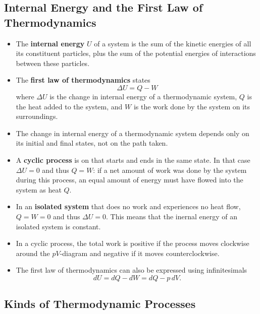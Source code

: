 \documentclass{article}
\begin{document}
\subsection{Internal Energy and the First Law of Thermodynamics}

\begin{itemize}
  \item The \textbf{internal energy} $U$ of a system is the sum of the kinetic energies of all its constituent particles, plus the sum of the potential energies of interactions between these particles.

  \item The \textbf{first law of thermodynamics} states \[\Delta U = Q - W\] where $\Delta U$ is the change in internal energy of a thermodynamic system, $Q$ is the heat added to the system, and $W$ is the work done by the system on its surroundings.

  \item The change in internal energy of a thermodynamic system depends only on its initial and final states, not on the path taken.

  \item A \textbf{cyclic process} is on that starts and ends in the same state. In that case $\Delta U = 0$ and thus $Q = W$: if a net amount of work was done by the system during this process, an equal amount of energy must have flowed into the system as heat $Q$.

  \item In an \textbf{isolated system} that does no work and experiences no heat flow, $Q = W = 0$ and thus $\Delta U = 0$. This means that the inernal energy of an isolated system is constant.

  \item In a cyclic process, the total work is positive if the process moves clockwise around the $p V$-diagram and negative if it moves counterclockwise.

  \item The first law of thermodynamics can also be expressed using infinitesimals \[d U = d Q - d W = d Q - p \,d V.\]
\end{itemize}

\subsection{Kinds of Thermodynamic Processes}
\end{document}
